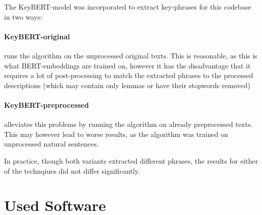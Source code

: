 The KeyBERT-model was incorporated to extract key-phrases for this codebase in two ways: 

\paragraph{KeyBERT-original} runs the algorithm on the unprocessed original texts. This is reasonable, as this is what BERT-embeddings are trained on, however it has the disadvantage that it requires a lot of post-processing to match the extracted phrases to the processed descriptions (which \eg may contain only lemmas or have their \glspl{stopword} removed)
\paragraph{KeyBERT-preprocessed} alleviates this problems by running the algorithm on already preprocessed texts. This may however lead to worse results, as the algorithm was trained on unprocessed natural sentences.

In practice, though both variants extracted different phrases, the results for either of the technqiues did not differ significantly.


\section{Used Software}



